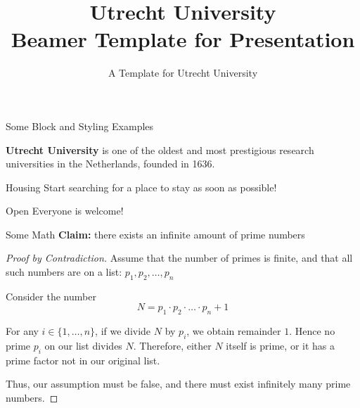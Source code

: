 \documentclass[aspectratio=169, 10pt]{beamer}
\title{Utrecht University\\Beamer Template for Presentation}
\author{A Template for Utrecht University}
\institute{Based on the Official Brand Guidelines}
\begin{document}
    \begin{frame}[plain]
        \titlepage
    \end{frame}

    \begin{frame}{Some Block and Styling Examples}
        \begin{definition}
            \textbf{Utrecht University} is one of the oldest and most prestigious research universities in the Netherlands, founded in 1636.
        \end{definition}

        \begin{alertblock}{Housing}
            Start searching for a place to stay \alert{as soon as possible}!
        \end{alertblock}

        \begin{exampleblock}{Open}
            Everyone is welcome!
        \end{exampleblock}
    \end{frame}

    \begin{frame}{Some Math}
        \textbf{Claim:} there exists an infinite amount of prime numbers
        \begin{proof}[Proof by Contradiction]
            Assume that the number of primes is finite, and that all such numbers are on a list: \(p_1, p_2, \dots, p_n\)
            \smallskip
            
            Consider the number
            \[N = p_1 \cdot p_2 \cdot \ldots \cdot p_n + 1\]
            
            For any $i \in \{1, \dots, n\}$, if we divide $N$ by $p_i$, we obtain remainder $1$. Hence no prime $p_i$ on our list divides $N$. Therefore, either $N$ itself is prime, or it has a prime factor not in our original list.
            \smallskip
            
            Thus, our assumption must be false, and there must exist infinitely many prime numbers.
        \end{proof}
    \end{frame}
\end{document}
